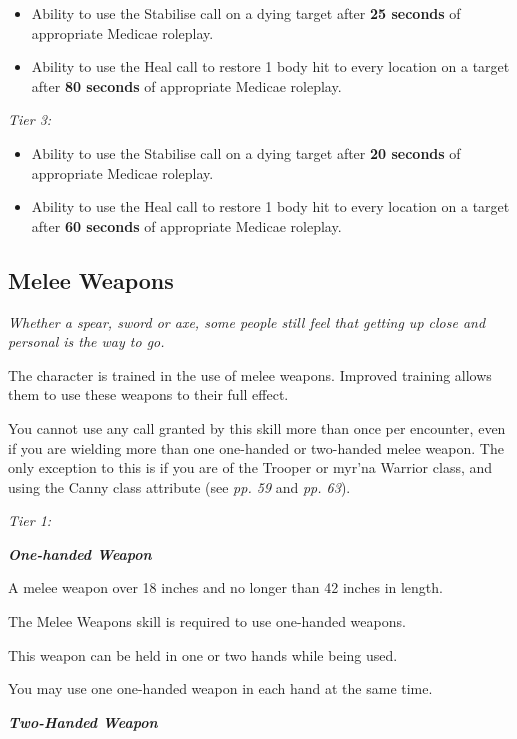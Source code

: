 \documentclass{scrbook}
\begin{document}
\begin{itemize}
\item Ability to use the Stabilise call on a dying target after \textbf{25 seconds} of appropriate Medicae roleplay.

\item Ability to use the Heal call to restore 1 body hit to every location on a target after \textbf{80 seconds} of appropriate Medicae roleplay.

\end{itemize}
\textit{Tier 3:}

\begin{itemize}
\item Ability to use the Stabilise call on a dying target after \textbf{20 seconds} of appropriate Medicae roleplay.

\item Ability to use the Heal call to restore 1 body hit to every location on a target after \textbf{60 seconds} of appropriate Medicae roleplay.

\end{itemize}
\subsection{Melee Weapons}

\textit{Whether a spear, sword or axe, some people still feel that getting up close and personal is the way to go.}

The character is trained in the use of melee weapons. Improved training allows them to use these weapons to their full effect.

You cannot use any call granted by this skill more than once per encounter, even if you are wielding more than one one-handed or two-handed melee weapon. The only exception to this is if you are of the Trooper or myr'na Warrior class, and using the Canny class attribute (see \textit{pp. 59} and \textit{pp. 63}).

\textit{Tier 1:}

\textbf{\textit{One-handed Weapon}}

A melee weapon over 18 inches and no longer than 42 inches in length.

The Melee Weapons skill is required to use one-handed weapons.

This weapon can be held in one or two hands while being used.

You may use one one-handed weapon in each hand at the same time.

\textbf{\textit{Two-Handed Weapon}}
\end{document}
